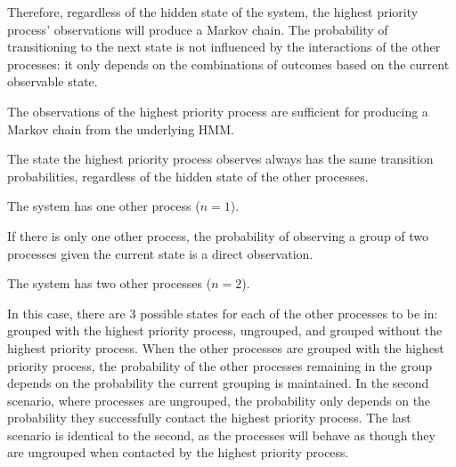 Therefore, regardless of the hidden state of the system, the highest priority process' observations will produce a Markov chain.
The probability of transitioning to the next state is not influenced by the interactions of the other processes: it only depends on the combinations of outcomes based on the current observable state.

\begin{thm}
    The observations of the highest priority process are sufficient for producing a Markov chain from the underlying \ac{HMM}.
\end{thm}
\begin{prooftight}
    The state the highest priority process observes always has the same transition probabilities, regardless of the hidden state of the other processes.
\begin{case}
    The system has one other process ($n=1$).
\end{case}
If there is only one other process, the probability of observing a group of two processes given the current state is a direct observation.
\begin{case}
    The system has two other processes ($n=2$).
\end{case}
In this case, there are 3 possible states for each of the other processes to be in: grouped with the highest priority process, ungrouped, and grouped without the highest priority process.
When the other processes are grouped with the highest priority process, the probability of the other processes remaining in the group depends on the probability the current grouping is maintained.
In the second scenario, where processes are ungrouped, the probability only depends on the probability they successfully contact the highest priority process.
The last scenario is identical to the second, as the processes will behave as though they are ungrouped when contacted by the highest priority process.


\end{prooftight}
